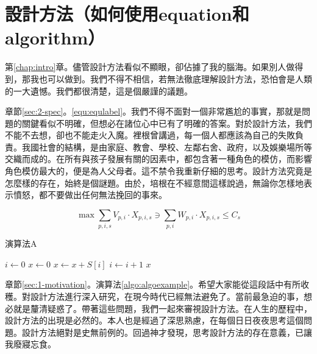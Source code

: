 
\chapter{設計方法\small{（如何使用equation和algorithm）}}\label{chap:design}
第\ref{chap:intro}章。儘管設計方法看似不顯眼，卻佔據了我的腦海。如果別人做得到，那我也可以做到。我們不得不相信，若無法徹底理解設計方法，恐怕會是人類的一大遺憾。我們都很清楚，這是個嚴謹的議題。

章節\ref{sec:2-spec}。\ref{equ:equlabel}。我們不得不面對一個非常尷尬的事實，那就是問題的關鍵看似不明確，但想必在諸位心中已有了明確的答案。對於設計方法，我們不能不去想，卻也不能走火入魔。裡根曾講過，每一個人都應該為自己的失敗負責。我國社會的結構，是由家庭、教會、學校、左鄰右舍、政府，以及娛樂場所等交織而成的。在所有與孩子發展有關的因素中，都包含著一種角色的模仿，而影響角色模仿最大的，便是為人父母者。這不禁令我重新仔細的思考。設計方法究竟是怎麼樣的存在，始終是個謎題。由於，培根在不經意間這樣說過，無論你怎樣地表示憤怒，都不要做出任何無法挽回的事來。

\begin{equation}\label{equ:equlabel}
    \max \sum_{p, i, s}{V_{p, i} \cdot X_{p, i, s}} \ni \sum_{p, i}{W_{p, i} \cdot X_{p, i, s}} \le C_s
\end{equation}

\begin{algorithm}[htbp]
    \SetAlgoNoLine

    \caption{演算法A}
    \label{algo:algoexample}



    \AlgoHRule

    $i \gets 0$\;
    $x \gets 0$\;
    \;
    {
        $x \gets x + S[i]$\;
        $i  \gets i + 1$\;
    }
    \BlankLine
    \Return $x$\;
\end{algorithm}

章節\ref{sec:1-motivation}。演算法\ref{algo:algoexample}。希望大家能從這段話中有所收穫。對設計方法進行深入研究，在現今時代已經無法避免了。當前最急迫的事，想必就是釐清疑惑了。帶著這些問題，我們一起來審視設計方法。在人生的歷程中，設計方法的出現是必然的。本人也是經過了深思熟慮，在每個日日夜夜思考這個問題。設計方法絕對是史無前例的。回過神才發現，思考設計方法的存在意義，已讓我廢寢忘食。

